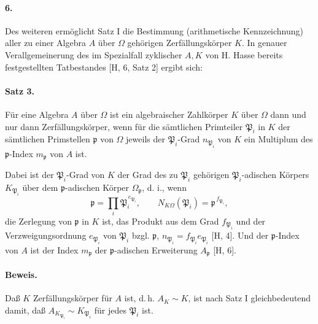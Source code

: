 \paragraph{6.}
Des weiteren ermöglicht Satz I die Bestimmung (arithmetische Kennzeichnung) aller zu einer Algebra \(A\) über \(\Omega\) gehörigen Zerfällungskörper \(K\). In genauer Verallgemeinerung des im Spezialfall zyklischer \(A,K\) von H. Hasse bereits festgestellten Tatbestandes [H, 6, Satz 2] ergibt sich:

\paragraph{Satz 3.}
Für eine Algebra \(A\) über \(\Omega\) ist ein algebraischer Zahlkörper \(K\) über \(\Omega\) dann und nur dann Zerfällungskörper, wenn für die sämtlichen Primteiler \(\mathfrak P_i\) in \(K\) der sämtlichen Primstellen \(\mathfrak p\) von \(\Omega\) jeweils der \(\mathfrak P_i\)-Grad \(n_{\mathfrak P_i}\) von \(K\) ein Multiplum des \(\mathfrak p\)-Index \(m_{\mathfrak p}\) von \(A\) ist.

Dabei ist der \(\mathfrak P_i\)-Grad von \(K\) der Grad des zu \(\mathfrak P_i\) gehörigen \(\mathfrak P_i\)-adischen Körpers \(K_{\mathfrak P_i}\) über dem \(\mathfrak p\)-adischen Körper \(\Omega_{\mathfrak p}\), d. i., wenn
\[
\mathfrak p=\prod_i \mathfrak P_i^{\,e_{\mathfrak P_i}},
        \qquad N_{K\Omega}(\mathfrak P_i)=\mathfrak p^{\,f_{\mathfrak P_i}},
\]
die Zerlegung von \(\mathfrak p\) in \(K\) ist, das Produkt aus dem Grad \(f_{\mathfrak P_i}\) und der Verzweigungsordnung \(e_{\mathfrak P_i}\) von \(\mathfrak P_i\) bzgl. \(\mathfrak p\), \(n_{\mathfrak P_i}=f_{\mathfrak P_i}e_{\mathfrak P_i}\) [H, 4]. Und der \(\mathfrak p\)-Index von \(A\) ist der Index \(m_{\mathfrak p}\) der \(\mathfrak p\)-adischen Erweiterung \(A_{\mathfrak p}\) [H, 6].

\paragraph{Beweis.}
Daß \(K\) Zerfällungskörper für \(A\) ist, d.\,h. \(A_K\sim K\), ist nach Satz I gleichbedeutend damit, daß \(A_{K_{\mathfrak P_i}}\sim K_{\mathfrak P_i}\) für jedes \(\mathfrak P_i\) ist.

